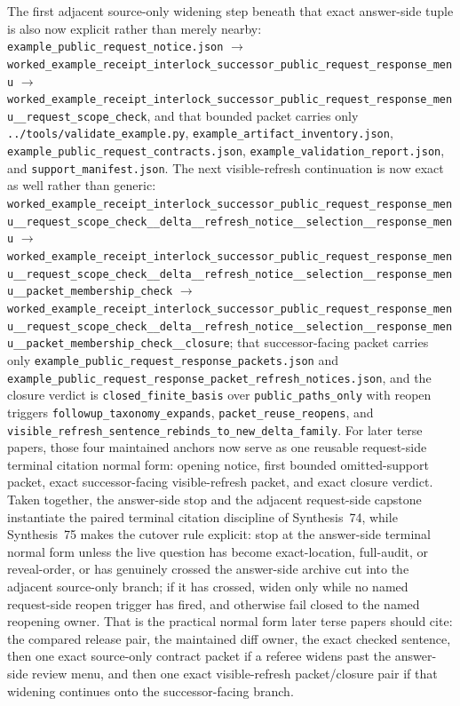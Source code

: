 \documentclass[11pt]{article}
\begin{document}
The first adjacent source-only widening step beneath that exact answer-side tuple is also now explicit rather than merely nearby: \nolinkurl{example_public_request_notice.json} $\to$ \texttt{worked\_example\_receipt\_interlock\_successor\_public\_request\_response\_menu} $\to$ \texttt{worked\_example\_receipt\_interlock\_successor\_public\_request\_response\_menu\_\_request\_scope\_check}, and that bounded packet carries only \nolinkurl{../tools/validate_example.py}, \nolinkurl{example_artifact_inventory.json}, \nolinkurl{example_public_request_contracts.json}, \nolinkurl{example_validation_report.json}, and \nolinkurl{support_manifest.json}. The next visible-refresh continuation is now exact as well rather than generic: \texttt{worked\_example\_receipt\_interlock\_successor\_public\_request\_response\_menu\_\_request\_scope\_check\_\_delta\_\_refresh\_notice\_\_selection\_\_response\_menu} $\to$ \texttt{worked\_example\_receipt\_interlock\_successor\_public\_request\_response\_menu\_\_request\_scope\_check\_\_delta\_\_refresh\_notice\_\_selection\_\_response\_menu\_\_packet\_membership\_check} $\to$ \texttt{worked\_example\_receipt\_interlock\_successor\_public\_request\_response\_menu\_\_request\_scope\_check\_\_delta\_\_refresh\_notice\_\_selection\_\_response\_menu\_\_packet\_membership\_check\_\_closure}; that successor-facing packet carries only \nolinkurl{example_public_request_response_packets.json} and \nolinkurl{example_public_request_response_packet_refresh_notices.json}, and the closure verdict is \texttt{closed\_finite\_basis} over \texttt{public\_paths\_only} with reopen triggers \texttt{followup\_taxonomy\_expands}, \texttt{packet\_reuse\_reopens}, and \texttt{visible\_refresh\_sentence\_rebinds\_to\_new\_delta\_family}. For later terse papers, those four maintained anchors now serve as one reusable request-side terminal citation normal form: opening notice, first bounded omitted-support packet, exact successor-facing visible-refresh packet, and exact closure verdict. Taken together, the answer-side stop and the adjacent request-side capstone instantiate the paired terminal citation discipline of Synthesis~74, while Synthesis~75 makes the cutover rule explicit: stop at the answer-side terminal normal form unless the live question has become exact-location, full-audit, or reveal-order, or has genuinely crossed the answer-side archive cut into the adjacent source-only branch; if it has crossed, widen only while no named request-side reopen trigger has fired, and otherwise fail closed to the named reopening owner.\cite{series:pairedterminalcitationdiscipline,series:pairedterminalcutoverrules}
That is the practical normal form later terse papers should cite: the compared release pair, the maintained diff owner, the exact checked sentence, then one exact source-only contract packet if a referee widens past the answer-side review menu, and then one exact visible-refresh packet/closure pair if that widening continues onto the successor-facing branch.
\end{document}
